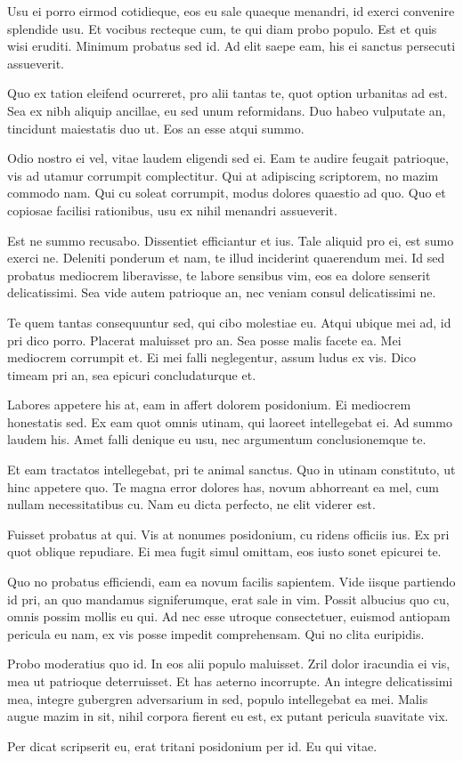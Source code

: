 \documentclass[twocolumn,twoside]{IEEEtran}
\begin{document}
 Usu ei porro eirmod cotidieque, eos eu sale quaeque menandri, id exerci
 convenire splendide usu. Et vocibus recteque cum, te qui diam probo populo.
 Est et quis wisi eruditi. Minimum probatus sed id. Ad elit saepe eam, his ei
 sanctus persecuti assueverit.

 Quo ex tation eleifend ocurreret, pro alii tantas te, quot option urbanitas ad
 est. Sea ex nibh aliquip ancillae, eu sed unum reformidans. Duo habeo
 vulputate an, tincidunt maiestatis duo ut. Eos an esse atqui summo.

 Odio nostro ei vel, vitae laudem eligendi sed ei. Eam te audire feugait
 patrioque, vis ad utamur corrumpit complectitur. Qui at adipiscing scriptorem,
 no mazim commodo nam. Qui cu soleat corrumpit, modus dolores quaestio ad quo.
 Quo et copiosae facilisi rationibus, usu ex nihil menandri assueverit.

 Est ne summo recusabo. Dissentiet efficiantur et ius. Tale aliquid pro ei, est
 sumo exerci ne. Deleniti ponderum et nam, te illud inciderint quaerendum mei.
 Id sed probatus mediocrem liberavisse, te labore sensibus vim, eos ea dolore
 senserit delicatissimi. Sea vide autem patrioque an, nec veniam consul
 delicatissimi ne.

 Te quem tantas consequuntur sed, qui cibo molestiae eu. Atqui ubique mei ad, id pri dico porro. Placerat maluisset pro an. Sea posse malis facete ea. Mei mediocrem corrumpit et. Ei mei falli neglegentur, assum ludus ex vis. Dico timeam pri an, sea epicuri concludaturque et.

 Labores appetere his at, eam in affert dolorem posidonium. Ei mediocrem honestatis sed. Ex eam quot omnis utinam, qui laoreet intellegebat ei. Ad summo laudem his. Amet falli denique eu usu, nec argumentum conclusionemque te.

 Et eam tractatos intellegebat, pri te animal sanctus. Quo in utinam constituto, ut hinc appetere quo. Te magna error dolores has, novum abhorreant ea mel, cum nullam necessitatibus cu. Nam eu dicta perfecto, ne elit viderer est.

 Fuisset probatus at qui. Vis at nonumes posidonium, cu ridens officiis ius. Ex pri quot oblique repudiare. Ei mea fugit simul omittam, eos iusto sonet epicurei te.

 Quo no probatus efficiendi, eam ea novum facilis sapientem. Vide iisque partiendo id pri, an quo mandamus signiferumque, erat sale in vim. Possit albucius quo cu, omnis possim mollis eu qui. Ad nec esse utroque consectetuer, euismod antiopam pericula eu nam, ex vis posse impedit comprehensam. Qui no clita euripidis.

 Probo moderatius quo id. In eos alii populo maluisset. Zril dolor iracundia ei vis, mea ut patrioque deterruisset. Et has aeterno incorrupte. An integre delicatissimi mea, integre gubergren adversarium in sed, populo intellegebat ea mei. Malis augue mazim in sit, nihil corpora fierent eu est, ex putant pericula suavitate vix.

 Per dicat scripserit eu, erat tritani posidonium per id. Eu qui vitae.
\end{document}
